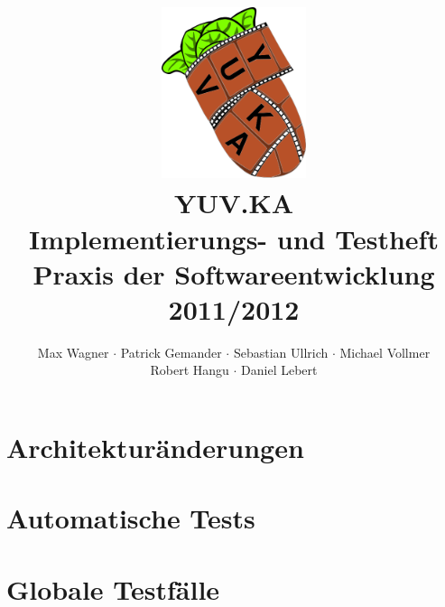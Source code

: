 \documentclass{scrartcl}
\begin{document}
\title{
    \hspace{-0.5cm} \includegraphics[height=5cm]{../../pflichtenheft/resources/logo.png} \\[1cm]
    \Huge{YUV.KA\\Implementierungs- und Testheft} \\ \large{Praxis der Softwareentwicklung 2011/2012}
}
\author{Max Wagner $\cdot$ Patrick Gemander $\cdot$ Sebastian Ullrich $\cdot$ Michael Vollmer \\ Robert Hangu $\cdot$ Daniel Lebert}
\maketitle

\newpage
\mbox{}
\newpage
\mbox{}

\tableofcontents
\clearpage

\section{Architekturänderungen}

\clearpage

\section{Automatische Tests}

\clearpage

\section{Globale Testfälle}

\clearpage



\end{document}
